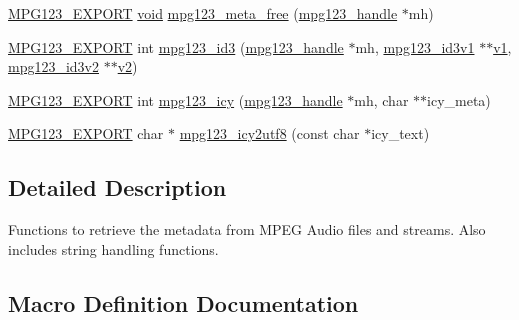 \begin{DoxyCompactItemize}
\item 
\mbox{\hyperlink{mpg123_8h_a2ba98cfba3f760879df70e755b2a61cc}{M\+P\+G123\+\_\+\+E\+X\+P\+O\+RT}} \mbox{\hyperlink{_s_d_l__opengles2__gl2ext_8h_ae5d8fa23ad07c48bb609509eae494c95}{void}} \mbox{\hyperlink{group__mpg123__metadata_ga4bca410c7589658fb8379b3cf3fa3e05}{mpg123\+\_\+meta\+\_\+free}} (\mbox{\hyperlink{group__mpg123__init_ga6728e2839a395f3a07d4514da659faca}{mpg123\+\_\+handle}} $\ast$mh)
\item 
\mbox{\hyperlink{mpg123_8h_a2ba98cfba3f760879df70e755b2a61cc}{M\+P\+G123\+\_\+\+E\+X\+P\+O\+RT}} int \mbox{\hyperlink{group__mpg123__metadata_ga8352786015f8ff33c7d1fe8a4d979c88}{mpg123\+\_\+id3}} (\mbox{\hyperlink{group__mpg123__init_ga6728e2839a395f3a07d4514da659faca}{mpg123\+\_\+handle}} $\ast$mh, \mbox{\hyperlink{structmpg123__id3v1}{mpg123\+\_\+id3v1}} $\ast$$\ast$\mbox{\hyperlink{_s_d_l__opengl__glext_8h_a435c176a02c061b43e19bdf7c86cceae}{v1}}, \mbox{\hyperlink{structmpg123__id3v2}{mpg123\+\_\+id3v2}} $\ast$$\ast$\mbox{\hyperlink{_s_d_l__opengl__glext_8h_a0928f6d0f0f794ba000a21dfae422136}{v2}})
\item 
\mbox{\hyperlink{mpg123_8h_a2ba98cfba3f760879df70e755b2a61cc}{M\+P\+G123\+\_\+\+E\+X\+P\+O\+RT}} int \mbox{\hyperlink{group__mpg123__metadata_ga637c01818ba80ac2275b76a8abefa36c}{mpg123\+\_\+icy}} (\mbox{\hyperlink{group__mpg123__init_ga6728e2839a395f3a07d4514da659faca}{mpg123\+\_\+handle}} $\ast$mh, char $\ast$$\ast$icy\+\_\+meta)
\item 
\mbox{\hyperlink{mpg123_8h_a2ba98cfba3f760879df70e755b2a61cc}{M\+P\+G123\+\_\+\+E\+X\+P\+O\+RT}} char $\ast$ \mbox{\hyperlink{group__mpg123__metadata_ga0a6e45c3f8dda42ada8a07c29c253c88}{mpg123\+\_\+icy2utf8}} (const char $\ast$icy\+\_\+text)
\end{DoxyCompactItemize}


\subsection{Detailed Description}
Functions to retrieve the metadata from M\+P\+EG Audio files and streams. Also includes string handling functions. 

\subsection{Macro Definition Documentation}
\mbox{\label{group__mpg123__metadata_ga8beaa04ade9db672e2bdf722c66b61ce}} 
